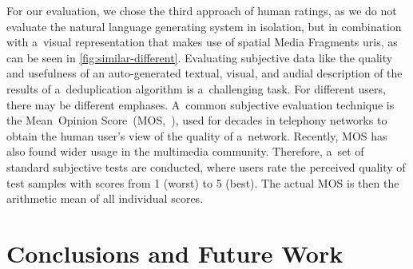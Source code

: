 \documentclass{article}
\begin{document}
For our evaluation, we chose the third approach of human ratings,
as we do not evaluate the natural language generating system in isolation,
but in combination with a~visual representation
that makes use of spatial Media Fragments {\sc uri}s,
as can be seen in \autoref{fig:similar-different}.
Evaluating subjective data like the quality and usefulness 
of an auto-generated textual, visual, and audial description
of the results of a~deduplication algorithm
is a~challenging task.
For different users, there may be different emphases.
A~common subjective evaluation technique
is the Mean~Opinion Score~(MOS,~\cite{itu1998mos}),
used for decades in telephony networks to
obtain the human user's view of the quality of a~network.
Recently, MOS has also found wider usage in the multimedia community.
Therefore, a~set of standard subjective tests are conducted,
where users rate the perceived quality of test samples
with scores from 1 (worst) to 5 (best).
The actual MOS is then the arithmetic mean of all individual scores.


\section{Conclusions and Future Work}
\label{sec:conclusions-and-future-work}



\end{document}

